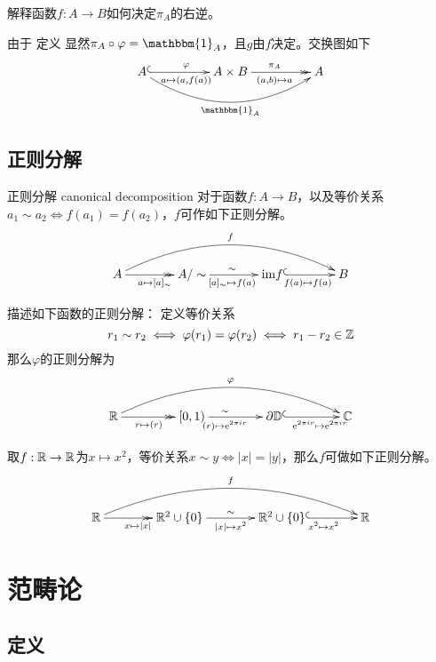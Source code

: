 \begin{example}
	解释函数$f:A\to B$如何决定$\pi_A$的右逆。
	
	由于
	定义
	显然$\pi_A\circ \varphi=\mathbbm{1}_A$，且$g$由$f$决定。交换图如下
	$$
	\xymatrix@=11ex{
		A \ar@/_2pc/[rr]_{\mathbbm{1}_A} \ar@{^{(}->}[r]^{\varphi}_{a\mapsto (a,f(a))} & A\times B \ar@{->>}[r]^{\pi_A}_{(a,b)\mapsto a} & A
	}
	$$
\end{example}

\subsection{正则分解}

\begin{definition}{正则分解 canonical decomposition}
	对于函数$f:A\to B$，以及等价关系$a_1\sim a_2\iff f(a_1)=f(a_2)$，$f$可作如下正则分解。
	$$
	\xymatrix@=9ex{
		A \ar@/^2pc/[rrr]^{f} \ar@{->>}[r]_{a\mapsto[a]_{\sim}} & A/\sim \ar@{->}[r]_{[a]_\sim\mapsto f(a)}^{\sim} & \mathrm{im}f \ar@{^{(}->}[r]_{f(a)\mapsto f(a)} & B
	}
	$$
\end{definition}

\begin{example}
	描述如下函数的正则分解：
	定义等价关系
	$$
	r_1\sim r_2 \iff \varphi(r_1)=\varphi(r_2) \iff r_1-r_2\in\mathbb{Z}
	$$
	那么$\varphi$的正则分解为
	$$
	\xymatrix@=10ex{
		\R \ar@/^2pc/[rrr]^{\varphi} \ar@{->>}[r]_(0.45){r\mapsto(r)} & [0,1) \ar@{->}[r]_(0.4){(r)\mapsto \mathrm{e}^{2\pi i r}}^(0.4){\sim} & \partial\mathbb{D} \ar@{^{(}->}[r]_(0.625){\mathrm{e}^{2\pi i r}\mapsto \mathrm{e}^{2\pi i r}} & \C
	}
	$$
\end{example}

\begin{example}
	取$f:\mathbb{R}\to\mathbb{R}$为$x\mapsto x^2$，等价关系$x\sim y\iff |x|=|y|$，那么$f$​可做如下正则分解。
	$$
	\xymatrix@=9ex{
		\R \ar@/^2pc/[rrr]^{f} \ar@{->>}[r]_{x\mapsto|x|} & \R^2\cup\{0\} \ar@{->}[r]_{|x|\mapsto x^2}^{\sim} & \R^2\cup\{0\} \ar@{^{(}->}[r]_{x^2\mapsto x^2} & \R
	}
	$$
\end{example}

\section{范畴论}

\subsection{定义}

